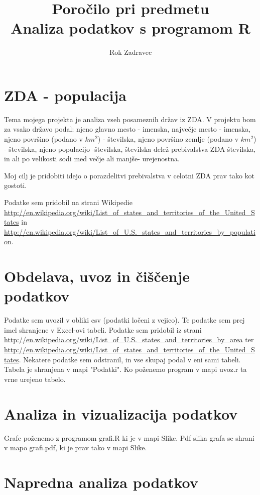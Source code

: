 \documentclass[11pt,a4paper]{article}
\begin{document}
\title{Poročilo pri predmetu \\
Analiza podatkov s programom R}
\author{Rok Zadravec}
\maketitle

\section{ZDA - populacija}

Tema mojega projekta je analiza vseh posameznih držav iz ZDA. V projektu bom za vsako državo podal: njeno glavno mesto - imenska, največje mesto - imenska, njeno površino (podano v $km^2$) - številska, njeno površino zemlje (podano v $km^2$) - številska, njeno populacijo -številska, številska delež prebivalstva ZDA številska, in ali po velikosti sodi med večje ali manjše- urejenostna.

Moj cilj je pridobiti idejo o porazdelitvi prebivalstva v celotni ZDA prav tako kot gostoti.

Podatke sem pridobil na strani Wikipedie \url{http://en.wikipedia.org/wiki/List_of_states_and_territories_of_the_United_States} in \url{http://en.wikipedia.org/wiki/List_of_U.S._states_and_territories_by_population}.

\section{Obdelava, uvoz in čiščenje podatkov}

Podatke sem uvozil v obliki csv (podatki ločeni z vejico). Te podatke sem prej imel shranjene v Excel-ovi tabeli. Podatke sem
pridobil iz strani \url{http://en.wikipedia.org/wiki/List_of_U.S._states_and_territories_by_area} ter
\url{http://en.wikipedia.org/wiki/List_of_states_and_territories_of_the_United_States}. Nekatere podatke sem odstranil, in vse skupaj podal v eni sami tabeli. Tabela je shranjena v mapi "Podatki".
Ko poženemo program v mapi uvoz.r ta vrne urejeno tabelo.

\section{Analiza in vizualizacija podatkov}

Grafe poženemo z programom grafi.R ki je v mapi Slike. Pdf slika grafa se shrani v mapo
grafi.pdf,  ki je prav tako v mapi Slike.



\section{Napredna analiza podatkov}

\end{document}
